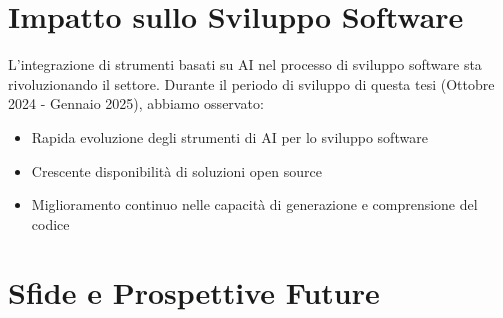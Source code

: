 \documentclass[12pt,a4paper,openright,twoside]{book}
\begin{document}
\section{Impatto sullo Sviluppo Software}
L'integrazione di strumenti basati su AI nel processo di sviluppo software sta rivoluzionando il settore. Durante il periodo di sviluppo di questa tesi (Ottobre 2024 - Gennaio 2025), abbiamo osservato:
\begin{itemize}
    \item Rapida evoluzione degli strumenti di AI per lo sviluppo software
    \item Crescente disponibilità di soluzioni open source
    \item Miglioramento continuo nelle capacità di generazione e comprensione del codice
\end{itemize}

\section{Sfide e Prospettive Future}


%



\backmatter

\nocite{*} %



\end{document}
